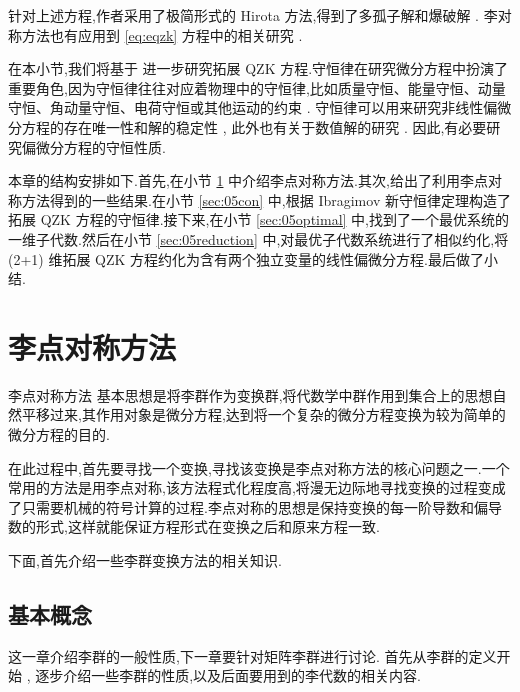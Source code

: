 针对上述方程,作者采用了极简形式的 Hirota 方法,得到了多孤子解和爆破解 \cite{biswas2013soli,bluman2010appli}. 李对称方法也有应用到 \eqref{eq:eqzk} 方程中的相关研究 \cite{sjoberg2007dou}.

在本小节,我们将基于 \cite{wang2014soli} 进一步研究拓展 QZK 方程.守恒律在研究微分方程中扮演了重要角色,因为守恒律往往对应着物理中的守恒律,比如质量守恒、能量守恒、动量守恒、角动量守恒、电荷守恒或其他运动的约束 \cite{mushtaq2005non,song2013top,song2013dom}. 守恒律可以用来研究非线性偏微分方程的存在唯一性和解的稳定性 \cite{wang2014soli}, 此外也有关于数值解的研究 \cite{wazwaz2005exact,wazwaz2008the}. 因此,有必要研究偏微分方程的守恒性质.

本章的结构安排如下.首先,在小节 \ref{sec:05lie} 中介绍李点对称方法.其次,给出了利用李点对称方法得到的一些结果.在小节 \ref{sec:05con} 中,根据 Ibragimov 新守恒律定理构造了拓展 QZK 方程的守恒律.接下来,在小节 \ref{sec:05optimal} 中,找到了一个最优系统的一维子代数.然后在小节 \ref{sec:05reduction} 中,对最优子代数系统进行了相似约化,将 (2+1) 维拓展 QZK 方程约化为含有两个独立变量的线性偏微分方程.最后做了小结.

\section{李点对称方法}\label{sec:05lie}
李点对称方法 \cite{peter2000sym,bluman2008symmetry} 基本思想是将李群作为变换群,将代数学中群作用到集合上的思想自然平移过来,其作用对象是微分方程,达到将一个复杂的微分方程变换为较为简单的微分方程的目的.

在此过程中,首先要寻找一个变换,寻找该变换是李点对称方法的核心问题之一.一个常用的方法是用李点对称,该方法程式化程度高,将漫无边际地寻找变换的过程变成了只需要机械的符号计算的过程.李点对称的思想是保持变换的每一阶导数和偏导数的形式,这样就能保证方程形式在变换之后和原来方程一致.

下面,首先介绍一些李群变换方法的相关知识.

\subsection{基本概念}
这一章介绍李群的一般性质,下一章要针对矩阵李群进行讨论.
首先从李群的定义开始 \cite{kirillov2008anintro}, 逐步介绍一些李群的性质,以及后面要用到的李代数的相关内容.


